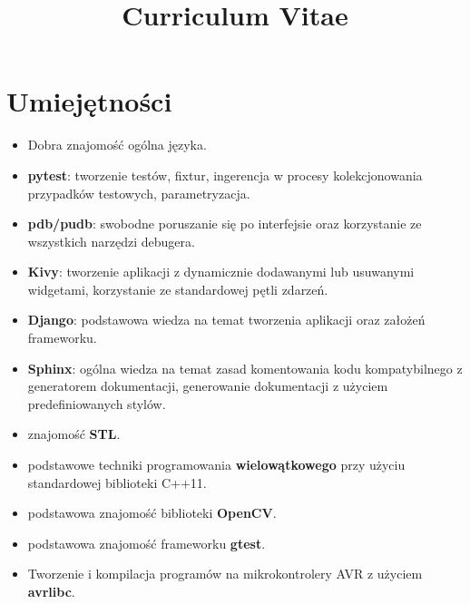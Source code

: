 \documentclass[11pt,a4paper,sans]{moderncv} %
\title{Curriculum Vitae}
\begin{document}
\makecvtitle %


\section{Umiejętności}

 {
    \begin{itemize}
    \item Dobra znajomość ogólna języka.
    \item \textbf{pytest}: tworzenie testów, fixtur, ingerencja w procesy kolekcjonowania przypadków testowych, parametryzacja.
    \item \textbf{pdb/pudb}: swobodne poruszanie się po interfejsie oraz korzystanie ze wszystkich narzędzi debugera.
    \item \textbf{Kivy}: tworzenie aplikacji z dynamicznie dodawanymi lub usuwanymi widgetami, korzystanie ze standardowej pętli zdarzeń.
    \item \textbf{Django}: podstawowa wiedza na temat tworzenia aplikacji oraz założeń frameworku.
    \item \textbf{Sphinx}: ogólna wiedza na temat zasad komentowania kodu kompatybilnego z generatorem dokumentacji, generowanie dokumentacji z użyciem predefiniowanych stylów.
    \end{itemize}
}
 {
    \begin{itemize}
    \item znajomość \textbf{STL}.
    \item podstawowe techniki programowania \textbf{wielowątkowego} przy użyciu standardowej biblioteki C++11.
    \item podstawowa znajomość biblioteki \textbf{OpenCV}.
    \item podstawowa znajomość frameworku \textbf{gtest}.
    \end{itemize}
}
 {\begin{itemize}
\item Tworzenie i kompilacja programów na mikrokontrolery AVR z użyciem \textbf{avrlibc}.
\end{itemize}}
\end{document}
